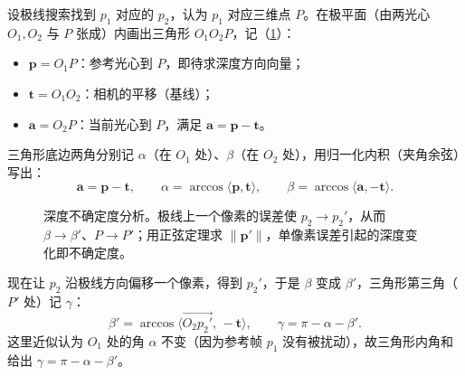 设极线搜索找到 $p_1$ 对应的 $p_2$，认为 $p_1$ 对应三维点 $P$。在极平面（由两光心 $O_1,O_2$ 与 $P$ 张成）内画出三角形 $O_1O_2P$，记（\cref{fig:dense-uncertainty}）：
\begin{itemize}
  \item $\mathbf{p}=O_1P$：参考光心到 $P$，即待求深度方向向量；
  \item $\mathbf{t}=O_1O_2$：相机的平移（基线）；
  \item $\mathbf{a}=O_2P$：当前光心到 $P$，满足 $\mathbf{a}=\mathbf{p}-\mathbf{t}$。
\end{itemize}
三角形底边两角分别记 $\alpha$（在 $O_1$ 处）、$\beta$（在 $O_2$ 处），用归一化内积（夹角余弦）写出：
\begin{equation}
  \mathbf{a}=\mathbf{p}-\mathbf{t},\qquad
  \alpha=\arccos\bigl\langle \mathbf{p}, \mathbf{t}\bigr\rangle,\qquad
  \beta=\arccos\bigl\langle \mathbf{a}, -\mathbf{t}\bigr\rangle.
  \label{eq:dense-unc-angles}
\end{equation}

\begin{figure}[ht]
\centering
{}
\caption{深度不确定度分析。极线上一个像素的误差使 $p_2\to p_2'$，从而 $\beta\to\beta'$、$P\to P'$；用正弦定理求 $\|\mathbf{p}'\|$，单像素误差引起的深度变化即不确定度。}
\label{fig:dense-uncertainty}
\end{figure}

现在让 $p_2$ 沿极线方向偏移一个像素，得到 $p_2'$，于是 $\beta$ 变成 $\beta'$，三角形第三角（$P'$ 处）记 $\gamma$：
\begin{equation}
  \beta'=\arccos\bigl\langle \overrightarrow{O_2 p_2'},\, -\mathbf{t}\bigr\rangle,\qquad
  \gamma=\pi-\alpha-\beta'.
  \label{eq:dense-unc-betap}
\end{equation}
这里近似认为 $O_1$ 处的角 $\alpha$ 不变（因为参考帧 $p_1$ 没有被扰动），故三角形内角和给出 $\gamma=\pi-\alpha-\beta'$。

